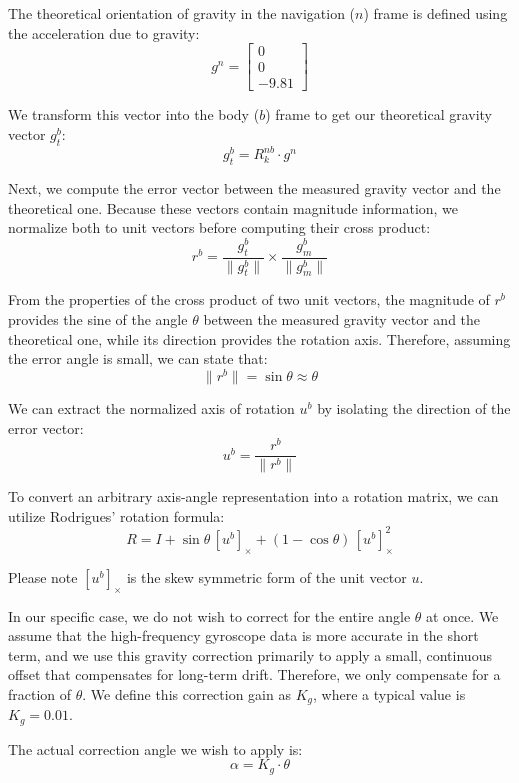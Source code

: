 \documentclass{article}
\begin{document}
\vspace{1em}
\noindent The theoretical orientation of gravity in the navigation ($n$) frame is defined using the acceleration due to gravity:
\[
g^n = 
\begin{bmatrix}
	0 \\
	0 \\
	-9.81
\end{bmatrix}
\]

\noindent We transform this vector into the body ($b$) frame to get our theoretical gravity vector $g_t^b$:
\[
g_t^b = R^{nb}_{k} \cdot g^n
\]

\noindent Next, we compute the error vector between the measured gravity vector and the theoretical one. Because these vectors contain magnitude information, we normalize both to unit vectors before computing their cross product:
\[
r^b = \frac{g_t^b}{\|g_t^b\|} \times \frac{g_m^b}{\|g_m^b\|} 
\]

\noindent From the properties of the cross product of two unit vectors, the magnitude of $r^b$ provides the sine of the angle $\theta$ between the measured gravity vector and the theoretical one, while its direction provides the rotation axis. Therefore, assuming the error angle is small, we can state that:
\[
\|r^b\| = \sin \theta \approx \theta
\]

\noindent We can extract the normalized axis of rotation $u^b$ by isolating the direction of the error vector:
\[
u^b = \frac{r^b}{\|r^b\|}
\]

\noindent To convert an arbitrary axis-angle representation into a rotation matrix, we can utilize Rodrigues' rotation formula:
\[
R = I + \sin\theta\,[u^b]_\times + (1-\cos\theta)\,[u^b]_\times^2
\]

\noindent Please note $[u^b]_\times$ is the skew symmetric form of the unit vector $u$.

\vspace{1em}
\noindent In our specific case, we do not wish to correct for the entire angle $\theta$ at once. We assume that the high-frequency gyroscope data is more accurate in the short term, and we use this gravity correction primarily to apply a small, continuous offset that compensates for long-term drift. Therefore, we only compensate for a fraction of $\theta$. We define this correction gain as $K_g$, where a typical value is $K_g = 0.01$.

\vspace{1em}
\noindent The actual correction angle we wish to apply is:
\[
\alpha = K_g \cdot \theta
\]
\end{document}
